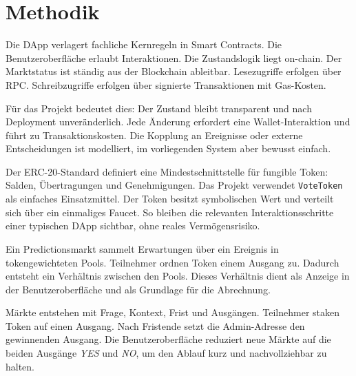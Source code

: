 \section{Methodik}
\label{chap:theorie}

Die DApp verlagert fachliche Kernregeln in Smart Contracts. Die Benutzeroberfläche
erlaubt Interaktionen. Die Zustandslogik liegt on-chain. Der Marktstatus ist
ständig aus der Blockchain ableitbar. Lesezugriffe erfolgen über RPC.
Schreibzugriffe erfolgen über signierte Transaktionen mit Gas-Kosten.

Für das Projekt bedeutet dies: Der Zustand bleibt transparent und nach
Deployment unveränderlich. Jede Änderung erfordert eine Wallet-Interaktion und
führt zu Transaktionskosten. Die Kopplung an Ereignisse oder externe
Entscheidungen ist modelliert, im vorliegenden System aber bewusst einfach.

Der ERC-20-Standard definiert eine Mindestschnittstelle für fungible Token:
Salden, Übertragungen und Genehmigungen. Das Projekt verwendet \texttt{VoteToken}
als einfaches Einsatzmittel. Der Token besitzt symbolischen Wert und verteilt sich
über ein einmaliges Faucet. So bleiben die relevanten Interaktionsschritte einer
typischen DApp sichtbar, ohne reales Vermögensrisiko.

Ein Predictionsmarkt sammelt Erwartungen über ein Ereignis in tokengewichteten
Pools. Teilnehmer ordnen Token einem Ausgang zu. Dadurch entsteht ein Verhältnis
zwischen den Pools. Dieses Verhältnis dient als Anzeige in der Benutzeroberfläche
und als Grundlage für die Abrechnung.

Märkte entstehen mit Frage, Kontext, Frist und Ausgängen. Teilnehmer staken Token
auf einen Ausgang. Nach Fristende setzt die Admin-Adresse den gewinnenden
Ausgang. Die Benutzeroberfläche reduziert neue Märkte auf die beiden Ausgänge
\emph{YES} und \emph{NO}, um den Ablauf kurz und nachvollziehbar zu halten.